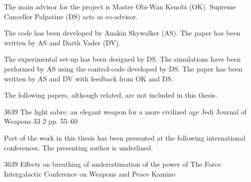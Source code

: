 %
\begin{divisionofwork}
	The main advisor for the project is Master Obi-Wan Kenobi (OK).
	Supreme Cancellor Palpatine (DS) acts as co-advisor.

	\paperitem
		The code has been developed by Anakin Skywalker (AS).
		The paper has been written by AS and Darth Vader (DV).

	\paperitem
		The experimental set-up has been designed by DS.
		The simulations have been performed by AS using the control-code
		developed by DS.
		The paper has been written by AS and DV with feedback from OK and DS.

\end{divisionofwork}


%
\begin{otherpublications}
	The following papers, although related, are not included in this thesis.

          {3639}%
          {The light sabre: an elegant weapon for a more civilized age}%
          {Jedi Journal of Weapons}%
          {33}%
          {2}%
          {pp. 55--60}%

\end{otherpublications}


%
\begin{conferences}
	Part of the work in this thesis has been presented at the following
        international conferences. The presenting author is underlined.

               {3639}%
               {Effects on breathing of underestimation of the power of The Force}%
               {Intergalactic Conference on Weapons and Peace}%
               {Kamino}%

\end{conferences}


%
\tableofcontents
